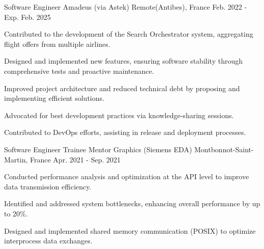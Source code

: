 
  \cventry
    {Software Engineer} %
    {Amadeus (via Astek)} %
    {Remote(Antibes), France} %
    {Feb. 2022 - Exp. Feb. 2025} %
    {
      \begin{cvitems} %
        \item {Contributed to the development of the Search Orchestrator system, aggregating flight offers from multiple airlines.}
        \item {Designed and implemented new features, ensuring software stability through comprehensive tests and proactive maintenance.}
        \item {Improved project architecture and reduced technical debt by proposing and implementing efficient solutions.}
        \item {Advocated for best development practices via knowledge-sharing sessions.}
        \item {Contributed to DevOps efforts, assisting in release and deployment processes.}
      \end{cvitems}
    }

  \cventry
    {Software Engineer Trainee} %
    {Mentor Graphics (Siemens EDA)} %
    {Montbonnot-Saint-Martin, France} %
    {Apr. 2021 - Sep. 2021} %
    {
      \begin{cvitems} %
        \item {Conducted performance analysis and optimization at the API level to improve data transmission efficiency.}
        \item {Identified and addressed system bottlenecks, enhancing overall performance by up to 20\%.}
        \item {Designed and implemented shared memory communication (POSIX) to optimize interprocess data exchanges.}
      \end{cvitems}
    }

